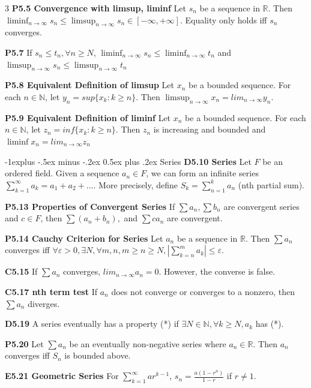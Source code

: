 \documentclass[10pt, landscape]{article}
\makeatletter
\renewcommand{\section}{\@startsection{section}{1}{0mm}%
                                {-1ex plus -.5ex minus -.2ex}%
                                {0.5ex plus .2ex}%
                                {\normalfont\large\bfseries}}
\renewcommand{\section}{\@startsection{section}{2}{0mm}%
                                {-1explus -.5ex minus -.2ex}%
                                {0.5ex plus .2ex}%
                                {\normalfont\normalsize\bfseries}}
\makeatother
\begin{document}
\begin{multicols*}{3}
\textbf{P5.5 Convergence with limsup, liminf} Let $s_n$ be a sequence in $\mathbb{R}$. Then $\liminf _{n \rightarrow\infty} s_n \leq \limsup_{n \rightarrow\infty} s_n \in [-\infty, +\infty]$. Equality only holds iff $s_n$ converges.

\textbf{P5.7} If $s_n \leq t_n, \forall n \geq N$, $\liminf_{n\rightarrow\infty}s_n \leq\liminf_{n\rightarrow\infty}t_n$ and $\limsup_{n\rightarrow\infty}s_n \leq \limsup_{n\rightarrow\infty}t_n$

\textbf{P5.8 Equivalent Definition of limsup} Let $x_n$ be a bounded sequence. For each $n \in \mathbb{N}$, let $y_n=sup\{x_k:k\geq n\}$. Then $\limsup_{n\rightarrow\infty}x_n=lim_{n \rightarrow\infty}y_n$.

\textbf{P5.9 Equivalent Definition of liminf} Let $x_n$ be a bounded sequence. For each $n \in \mathbb{N}$, let $z_n=inf\{x_k:k\geq n\}$. Then $z_n$ is increasing and bounded and $\liminf x_n=lim_{n\rightarrow\infty}z_n$

\section{Series}
\textbf{D5.10 Series} Let $F$ be an ordered field. Given a sequence $a_n\in F$, we can form an infinite series $\sum_{k=1}^\infty a_k=a_1+a_2+...$. More precisely, define $S_k=\sum_{n=1}^ka_n$ (nth partial sum).

\textbf{P5.13 Properties of Convergent Series} If $\sum a_n, \sum b_n$ are convergent series and $c \in F$, then $\sum(a_n+b_n),$ and $\sum ca_n$ are convergent.

\textbf{P5.14 Cauchy Criterion for Series} Let $a_n$ be a sequence in $\mathbb{R}$. Then $\sum a_n$ converges iff $\forall \varepsilon>0, \exists N,\forall m,n, m \geq n \geq N,|\sum_{k=n}^ma_k|\leq \varepsilon$.

\textbf{C5.15} If $\sum a_n$ converges, $lim_{n\rightarrow\infty}a_n=0$. However, the converse is false.

\textbf{C5.17 nth term test} If $a_n$ does not converge or converges to a nonzero, then $\sum a_n$ diverges.

\textbf{D5.19} A series eventually has a property (*) if $\exists N \in \mathbb{N}, \forall k \geq N, a_k$ has (*).

\textbf{P5.20} Let $\sum a_n$ be an eventually non-negative series where $a_n \in \mathbb{R}$. Then $a_n$ converges iff $S_n$ is bounded above.

\textbf{E5.21 Geometric Series} For $\sum_{k=1}^\infty ar^{k-1}$, $s_n=\frac{a(1-r^n)}{1-r}$ if $r \neq 1$.


\end{multicols*}
\end{document}
